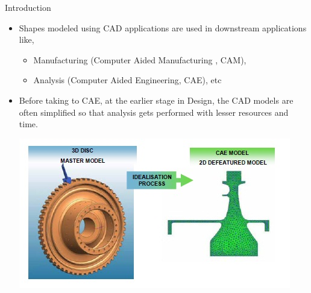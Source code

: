 
\begin{frame}{Introduction}
\begin{itemize}[noitemsep,label=\textbullet,topsep=2pt,parsep=2pt,partopsep=2pt]
\item Shapes modeled using CAD applications are used in downstream applications like,
\begin{itemize}
\item Manufacturing (Computer Aided Manufacturing , CAM),
\item Analysis (Computer Aided Engineering, CAE), etc
\end{itemize}
\item Before taking to CAE, at the earlier stage in Design, the CAD models are often simplified so that analysis gets performed with lesser resources and time.

\vspace{.5cm}
\includegraphics[width=0.7\linewidth]{../Common/images/idealization.jpg}
\end{itemize}


\end{frame}



